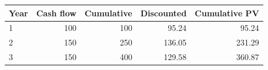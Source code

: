\begin{tabular}{lrrrr}\toprule
Year & Cash flow & Cumulative & Discounted & Cumulative PV\\\midrule
1 & 100 & 100 & 95.24 & 95.24\\
2 & 150 & 250 & 136.05 & 231.29\\
3 & 150 & 400 & 129.58 & 360.87\\
\bottomrule\end{tabular}
